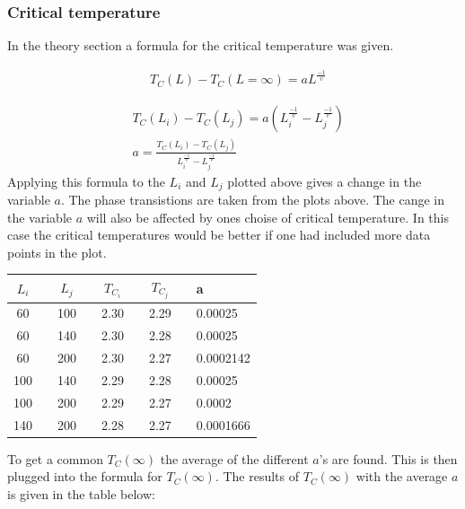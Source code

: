 \pagebreak
\subsubsection{Critical temperature}
In the theory section a formula for the critical temperature was given. 

\begin{align*}
     &T_C (L) - T_C (L=\infty) = a L^{\frac{-1}{v}}
\end{align*}

 \begin{align*}
     &T_C (L_i) - T_C (L_j) = a 
     \left(
     L_i^{\frac{-1}{v}}-L_j^{\frac{-1}{v}}
     \right)
     \\
     &a = 
     \frac{T_C (L_i) - T_C (L_j)} 
     {
     L_i^{\frac{-1}{v}}-L_j^{\frac{-1}{v}}
     }
 \end{align*}
Applying this formula to the $L_i$ and $L_j$ plotted above gives a change in the variable $a$. The phase transistions are taken from the plots above. The cange in the variable $a$ will also be affected by ones choise of critical temperature. In this case the critical temperatures would be better if one had included more data points in the plot.

\begin{center}
\label{tab:extracting a}
\begin{tabularx}{\textwidth}{|c| X c| X c| X c| X l|}
    \hline 
        $L_i$ && $L_j$ && $T_{C_i}$ && $T_{C_j}$ && a\\ 
    \hline
        60      &&      100     &&  2.30  &&  2.29  && 0.00025 \\
        60      &&      140     &&  2.30  &&  2.28  && 0.00025 \\
        60      &&      200     &&  2.30  &&  2.27  && 0.0002142 \\
        100     &&      140     &&  2.29  &&  2.28  && 0.00025 \\
        100     &&      200     &&  2.29  &&  2.27  && 0.0002 \\
        140     &&      200     &&  2.28  &&  2.27  && 0.0001666 \\
    \hline
\end{tabularx}
\end{center}

To get a common $T_C(\infty)$ the average of the different $a$'s are found. This is then plugged into the formula for $T_C(\infty)$. The results of $T_C(\infty)$ with the average $a$ is given in the table below:

